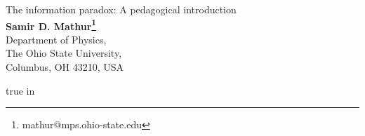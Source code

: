 \documentclass[12pt]{article}
\begin{document}


\def\be{\begin{equation}}
\def\ee{\end{equation}}
\def\bea{\begin{eqnarray}}
\def\eea{\end{eqnarray}}
\def\p{\partial}
\def\r{\rightarrow}
\def\h{{1\over 2}}
\def\b{

\bigskip

}
\def\hb{Hawking believer:\quad}
\def\u{|\uparrow\rangle}
\def\d{|\downarrow\rangle}
\def\sq{{1\over \sqrt{2}}}
\def\z{|0\rangle}
\def\o{|1\rangle}
\def\sqi{{1\over \sqrt{2}}}

\begin{flushright}
\end{flushright}
\vspace{20mm}
\begin{center}
{\LARGE  The information paradox: A pedagogical introduction}
\\
\vspace{18mm}
{\bf  Samir D. Mathur\footnote{mathur@mps.ohio-state.edu} }\\

\vspace{8mm}
Department of Physics,\\ The Ohio State University,\\ Columbus,
OH 43210, USA\\
\vspace{4mm}
\end{center}
\vspace{10mm}
\thispagestyle{empty}
\begin{abstract}

The black hole information paradox is a very poorly understood problem. It is often believed that Hawking's argument is not precisely formulated, and a more careful accounting of naturally occurring quantum corrections will allow the radiation process to become unitary. We show that such is not the case, by proving that small corrections to the leading order Hawking computation cannot remove the entanglement between the radiation and the hole. We  formulate Hawking's argument as a `theorem': assuming `traditional' physics at the horizon and usual assumptions of locality we {\it will} be forced into mixed states or remnants. We also argue that one cannot explain away the problem by   invoking AdS/CFT duality. We conclude with recent results on the quantum physics of black holes which show the the interior of black holes have a `fuzzball' structure. This nontrivial structure of microstates resolves the  information paradox, and gives a qualitative picture of how classical intuition can break down in black hole physics.





\end{abstract}
 true in
\end{document}

